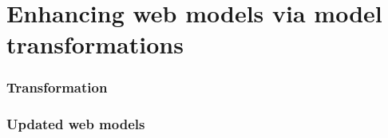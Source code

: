 \chead{}

\chapter{Enhancing web models via model transformations}
\label{enhancing-web-models-via-model-transformations}

\subsection{Transformation}

\subsection{Updated web models}

